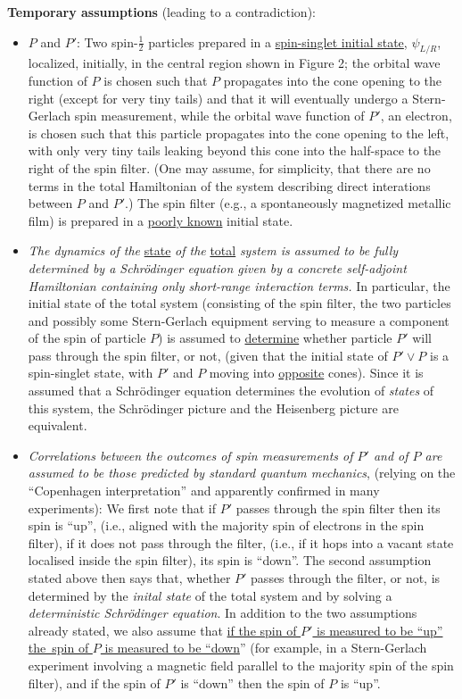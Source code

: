 \documentclass[a4paper,11pt]{article}
\begin{document}
{\bf{Temporary assumptions}} (leading to a contradiction):
\begin{itemize} 
\item{$P$ and $P'$: Two spin-$\frac{1}{2}$ particles prepared in a \underline{spin-singlet initial state}, $\psi_{L/R}$, localized, initially, in the central region shown in Figure 2; the orbital wave function of $P$ is chosen such that $P$ propagates into the cone opening to the right (except for very tiny tails) and that it will eventually undergo a Stern-Gerlach spin measurement, while the orbital wave function of $P'$, an electron, is chosen such that this particle propagates into the cone opening to the left, with only very tiny tails leaking beyond this cone into the half-space to the right of the spin filter. (One may assume, for simplicity, that there are no terms in the total Hamiltonian of the system describing direct interations between $P$ and $P'$.)
The spin filter (e.g., a spontaneously magnetized metallic film) is prepared in a \underline{poorly known} initial state.}
\item{\textit{The dynamics of the} \underline{state} \textit{of the} \underline{total} \textit{system is assumed to be fully determined by a Schr\"{o}dinger equation given by a concrete self-adjoint Hamiltonian containing only short-range interaction terms.} In particular, the initial state of the total system (consisting of the spin filter, the two particles and possibly some Stern-Gerlach equipment serving to measure a component of the spin of particle $P$) is assumed to \underline{determine} whether particle $P'$ will pass through the spin filter, or not, (given that the initial state of $P' \vee P$ is a spin-singlet state, with $P'$ and $P$ moving into \underline{opposite} cones).} Since it is assumed that a Schr\"{o}dinger equation determines the evolution of \textit{states} of this system, the Schr\"{o}dinger picture and the Heisenberg picture are equivalent.
\item{\textit{Correlations between the outcomes of spin measurements of $P'$ and of $P$ are assumed to be those predicted by standard quantum mechanics}, (relying on the ``Copenhagen interpretation'' and apparently confirmed in many experiments): We first note that if $P'$ passes through the spin filter then its spin is ``up'', (i.e., aligned with the majority spin of electrons in the spin filter), if it does not pass through the filter, (i.e., if it hops into a vacant state localised inside the spin filter), its spin is ``down''. The second assumption stated above then says that, whether $P'$ passes through the filter, or not, is determined by the \textit{inital state} of the total system and by solving a \textit{deterministic Schr\"{o}dinger equation}. In addition to the two assumptions already stated, we also assume that \underline{if the spin of $P'$ is measured to be ``up'' the \,spin of $P$ is measured to be ``down}'' (for example, in a Stern-Gerlach experiment involving a magnetic field parallel to the majority spin of the spin filter), and if the spin of $P'$ is ``down'' then the spin of $P$ is ``up''.}
\end{itemize}
\end{document}
